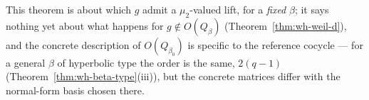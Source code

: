 \begin{scope}
This theorem is about which $g$ admit a $\mu_2$-valued lift, for a
\emph{fixed} $\beta$; it says nothing yet about what happens for
$g\notin O(Q_\beta)$ (Theorem~\ref{thm:wh-weil-d}), and the concrete
description of $O(Q_{\beta_0})$ is specific to the reference cocycle — for a
general $\beta$ of hyperbolic type the order is the same, $2(q-1)$
(Theorem~\ref{thm:wh-beta-type}(iii)), but the concrete matrices differ with
the normal-form basis chosen there.
\end{scope}


